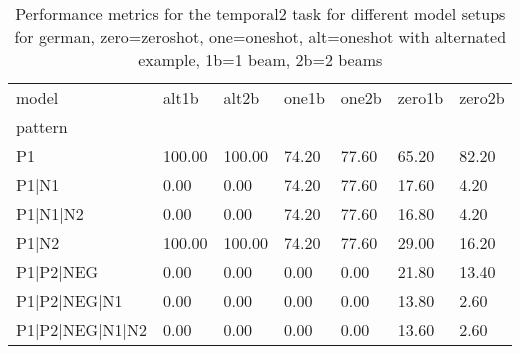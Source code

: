 \begin{table}[h]
\begin{tabular}{l|llllll}
\toprule
model & alt1b & alt2b & one1b & one2b & zero1b & zero2b \\
pattern &  &  &  &  &  &  \\
\midrule
P1 & 100.00 & 100.00 & 74.20 & 77.60 & 65.20 & 82.20 \\
P1|N1 & 0.00 & 0.00 & 74.20 & 77.60 & 17.60 & 4.20 \\
P1|N1|N2 & 0.00 & 0.00 & 74.20 & 77.60 & 16.80 & 4.20 \\
P1|N2 & 100.00 & 100.00 & 74.20 & 77.60 & 29.00 & 16.20 \\
P1|P2|NEG & 0.00 & 0.00 & 0.00 & 0.00 & 21.80 & 13.40 \\
P1|P2|NEG|N1 & 0.00 & 0.00 & 0.00 & 0.00 & 13.80 & 2.60 \\
P1|P2|NEG|N1|N2 & 0.00 & 0.00 & 0.00 & 0.00 & 13.60 & 2.60 \\
\bottomrule
\end{tabular}
\caption{Performance metrics for the temporal2 task for different model setups for german, zero=zeroshot, one=oneshot, alt=oneshot with alternated example, 1b=1 beam, 2b=2 beams}
\label{tab:de_temporal2_performance}
\end{table}
